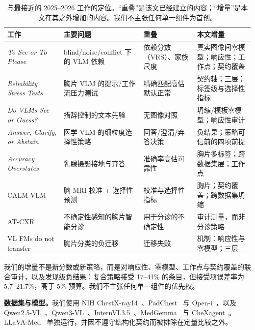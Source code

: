 \begin{table}[t]
\centering
\footnotesize
\setlength{\tabcolsep}{3pt}
\caption{与最接近的 2025--2026 工作的定位。``重叠''是该文已经建立的内容；``增量''是本文在其之外增加的内容。我们不主张任何单一组件为首创。}
\label{tab:competitors}
\begin{tabular}{@{}>{\raggedright\arraybackslash}p{}>{\raggedright\arraybackslash}p{}>{\raggedright\arraybackslash}p{}>{\raggedright\arraybackslash}p{}@{}}
\toprule
工作 & 主要问题 & 重叠 & 本文增量 \\
\midrule
\emph{To See or To Please}~\citep{anon2026see} & blind/noise/conflict 下的 VLM 依赖 & 依赖分数（VRS）、家族尺度 & 真实图像间零模型；响应性；工作点；契约覆盖 \\
\emph{Reliability Stress Tests}~\citep{anon2026stress} & 胸片 VLM 的提示/工作流压力测试 & 精确匹配高估默认正常 & 契约轴；三层；标签级与选择性指标 \\
\emph{Do VLMs See or Guess?}~\citep{anon2026guess} & 措辞控制的文本先验 & 无图像对照 & 坍缩/模板零模型；响应性审计 \\
\emph{Answer, Clarify, or Abstain}~\citep{nguyen2026answer} & 医学 VLM 的细粒度选择性策略 & 回答/澄清/弃答决策 & 负结果；策略可信前的四项前提 \\
\emph{Accuracy Overstates}~\citep{qu2026accuracy} & 乳腺摄影接地与弃答 & 准确率高估可靠性 & 胸片多标签；跨数据集层；工作点 \\
CALM-VLM~\citep{dhinagar2026calm} & 脑 MRI 校准 + 选择性预测 & 校准与选择性指标 & 胸片；契约覆盖；跨数据集坍缩 \\
AT-CXR~\citep{li2025atcxr} & 不确定性感知的胸片智能分诊 & 用于分诊的不确定性 & 审计测量，而非分诊策略 \\
VL FMs do not transfer~\citep{fisher2025negative} & 胸片分类的负迁移 & 迁移失败 & 机制：响应性与零模型；三层 \\
\bottomrule
\end{tabular}
\end{table}

我们的增量不是新分数或新策略，而是对响应性、零模型、工作点与契约覆盖的联合审计，以及发现级负结果：复合策略接受 17--41\% 的条目，但接受项误差率为 5.7--21.7\%，高于 5\% 预算。我们不主张任何单一组件的优先权。

\textbf{数据集与模型。}我们使用 NIH ChestX-ray14~\citep{wang2017chestxray8}、PadChest~\citep{bustos2020padchest} 与 Open-i~\citep{demnerfushman2016openi}，以及 Qwen2.5-VL~\citep{bai2025qwen25vl}、Qwen3-VL~\citep{qwen2025qwen3vl}、InternVL3.5~\citep{opengvlab2025internvl35}、MedGemma~\citep{sellergren2025medgemma} 与 CheXagent~\citep{chen2024chexagent}。LLaVA-Med~\citep{li2024llavamed} 单独运行，并因不遵守结构化契约而被排除在定量比较之外。
